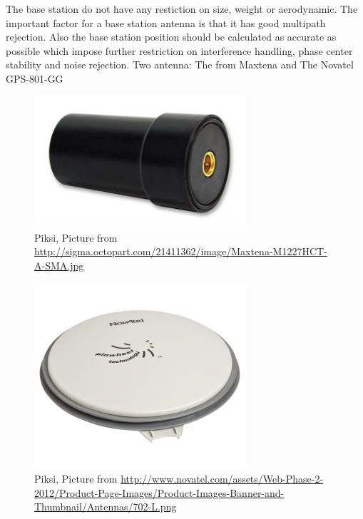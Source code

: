 The base station do not have any restiction on size, weight or aerodynamic. The important factor for a base station antenna is that it has good multipath rejection. Also the base station position should be calculated as accurate as possible which impose further restriction on interference handling, phase center stability and noise rejection.
Two antenna: The  from Maxtena and The Novatel GPS-801-GG
\begin{figure}[H]
	\centering
		\includegraphics[width=0.7\textwidth]{figs/Maxtena-M1227HCT-A-SMA-image.jpg}
		\caption{Piksi, Picture from \url{http://sigma.octopart.com/21411362/image/Maxtena-M1227HCT-A-SMA.jpg}}
		\label{figure:Piksi}
\end{figure}

\begin{figure}[H]
	\centering
		\includegraphics[width=0.7\textwidth]{figs/702-L.png}
		\caption{Piksi, Picture from \url{http://www.novatel.com/assets/Web-Phase-2-2012/Product-Page-Images/Product-Images-Banner-and-Thumbnail/Antennas/702-L.png}}
		\label{figure:Piksi}
\end{figure}


